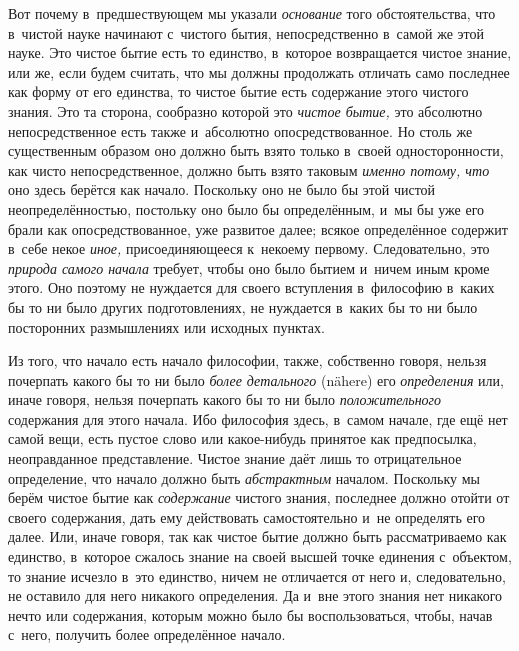 Вот почему в~предшествующем мы указали {\em основание} того обстоятельства, что
в~чистой науке начинают с~чистого бытия, непосредственно в~самой же этой науке.
Это чистое бытие есть то единство, в~которое возвращается чистое знание, или
же, если будем считать, что мы должны продолжать отличать само последнее как
форму от его единства, то чистое бытие есть содержание этого чистого знания.
Это та сторона, сообразно которой это {\em чистое бытие,} это абсолютно
непосредственное есть также и~абсолютно опосредствованное. Но столь же
существенным образом оно должно быть взято только в~своей односторонности, как
чисто непосредственное, должно быть взято таковым {\em именно потому, что} оно
здесь берётся как начало. Поскольку оно не было бы этой чистой
неопределённостью, постольку оно было бы определённым, и~мы бы уже его брали
как опосредствованное, уже развитое далее; всякое определённое содержит в~себе
некое {\em иное,} присоединяющееся к~некоему первому. Следовательно, это
{\em природа самого начала} требует, чтобы оно было бытием и~ничем иным кроме
этого. Оно поэтому не нуждается для своего вступления в~философию в~каких бы то
ни было других подготовлениях, не нуждается в~каких бы то ни было посторонних
размышлениях или исходных пунктах.

Из того, что начало есть начало философии, также, собственно говоря, нельзя
почерпать какого бы то ни было {\em более детального} (nähere) его
{\em определения} или, иначе говоря, нельзя почерпать какого бы то ни было
{\em положительного} содержания для этого начала. Ибо философия здесь, в~самом
начале, где ещё нет самой вещи, есть пустое слово или какое-нибудь принятое как
предпосылка, неоправданное представление. Чистое знание даёт лишь то
отрицательное определение, что начало должно быть {\em абстрактным} началом.
Поскольку мы берём чистое бытие как {\em содержание} чистого знания, последнее
должно отойти от своего содержания, дать ему действовать самостоятельно и~не
определять его далее. Или, иначе говоря, так как чистое бытие должно быть
рассматриваемо как единство, в~которое сжалось знание на своей высшей точке
единения с~объектом, то знание исчезло в~это единство, ничем не отличается от
него и, следовательно, не оставило для него никакого определения. Да и~вне
этого знания нет никакого нечто или содержания, которым можно было бы
воспользоваться, чтобы, начав с~него, получить более определённое начало.

